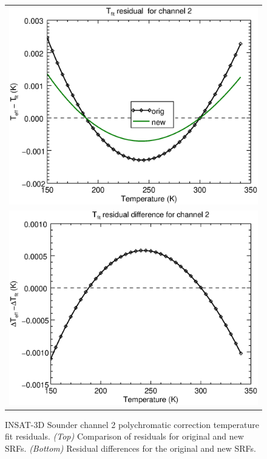 \begin{figure}[H]
  \centering
  \begin{tabular}{c}
    \includegraphics[scale=0.55]{graphics/sndr/tfit/sndr_insat3d-2.tfit.eps} \\
    \includegraphics[scale=0.55]{graphics/sndr/tfit/sndr_insat3d-2.tfit.difference.eps}
  \end{tabular}
  \caption{INSAT-3D Sounder channel 2 polychromatic correction temperature fit residuals. \emph{(Top)} Comparison of residuals for original and new SRFs. \emph{(Bottom)} Residual differences for the original and new SRFs.}
  \label{fig:sndr_ch2_tfit}
\end{figure}


